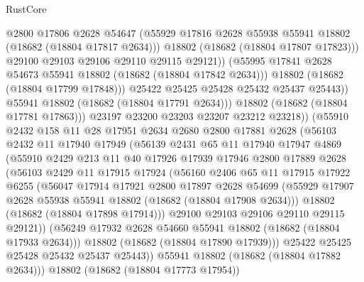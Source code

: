 \begin{lexlean}{RustCore}
\begin{coremodule}
                        @2800
                        @17806
                        @2628
                        @54647
                        (@55929 @17816 @2628 @55938 @55941 @18802 (@18682 (@18804 @17817 @2634)))
                        @18802
                        (@18682 (@18804 @17807 @17823)))
                      @29100
                      @29103
                      @29106
                      @29110
                      @29115
                      @29121))
                  (@55995 @17841 @2628 @54673 @55941 @18802 (@18682 (@18804 @17842 @2634)))
                  @18802
                  (@18682 (@18804 @17799 @17848)))
                @25422
                @25425
                @25428
                @25432
                @25437
                @25443))
            @55941
            @18802
            (@18682 (@18804 @17791 @2634)))
          @18802
          (@18682 (@18804 @17781 @17863)))
        @23197
        @23200
        @23203
        @23207
        @23212
        @23218))
    (@55910
      @2432
      @158
      @11
      @28
      @17951
      @2634
      @2680
      @2800
      @17881
      @2628
      (@56103
        @2432
        @11
        @17940
        @17949
        (@56139
          @2431
          @65
          @11
          @17940
          @17947
          @4869
          (@55910
            @2429
            @213
            @11
            @40
            @17926
            @17939
            @17946
            @2800
            @17889
            @2628
            (@56103
              @2429
              @11
              @17915
              @17924
              (@56160
                @2406
                @65
                @11
                @17915
                @17922
                @6255
                (@56047
                  @17914
                  @17921
                  @2800
                  @17897
                  @2628
                  @54699
                  (@55929 @17907 @2628 @55938 @55941 @18802 (@18682 (@18804 @17908 @2634)))
                  @18802
                  (@18682 (@18804 @17898 @17914)))
                @29100
                @29103
                @29106
                @29110
                @29115
                @29121))
            (@56249 @17932 @2628 @54660 @55941 @18802 (@18682 (@18804 @17933 @2634)))
            @18802
            (@18682 (@18804 @17890 @17939)))
          @25422
          @25425
          @25428
          @25432
          @25437
          @25443))
      @55941
      @18802
      (@18682 (@18804 @17882 @2634)))
    @18802
    (@18682 (@18804 @17773 @17954))

\end{coremodule}
\end{lexlean}
